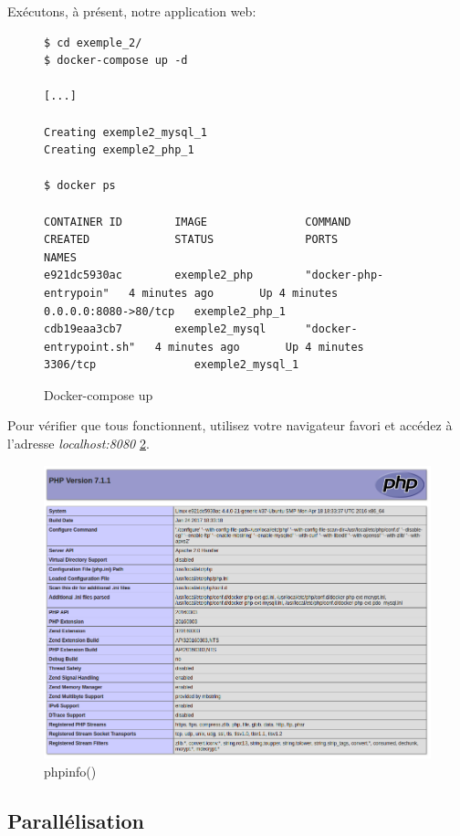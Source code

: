Exécutons, à présent, notre application web:

\begin{figure}[H] 
\centering 
\begin{lstlisting}[frame=single]
$ cd exemple_2/
$ docker-compose up -d

[...]

Creating exemple2_mysql_1
Creating exemple2_php_1

$ docker ps

CONTAINER ID        IMAGE               COMMAND                  CREATED             STATUS              PORTS                  NAMES
e921dc5930ac        exemple2_php        "docker-php-entrypoin"   4 minutes ago       Up 4 minutes        0.0.0.0:8080->80/tcp   exemple2_php_1
cdb19eaa3cb7        exemple2_mysql      "docker-entrypoint.sh"   4 minutes ago       Up 4 minutes        3306/tcp               exemple2_mysql_1

\end{lstlisting}
\caption[Docker-compose up]{Docker-compose up}
\label{fig:composeUp} 
\end{figure}

Pour vérifier que tous fonctionnent, utilisez votre navigateur favori et accédez à l'adresse \emph{localhost:8080} \ref{fig:phpinfo}.

\begin{figure}[H] 
\centering 
\includegraphics[width=1\columnwidth]{img/phpinfo} 
\caption[phpinfo]{phpinfo()}
\label{fig:phpinfo} 
\end{figure}

\subsection{Parallélisation}

